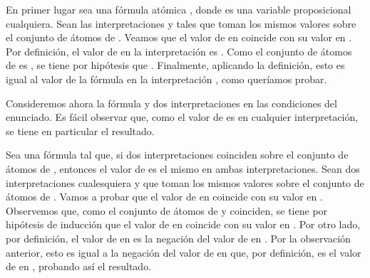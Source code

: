 \begin{isabellebody}
\begin{isamarkuptext}
\begin{demostracion}
    En primer lugar sea una fórmula atómica , donde  es una 
    variable proposicional cualquiera. Sean las interpretaciones
     y  tales que toman los mismos valores sobre el conjunto de
    átomos de . Veamos que el valor de  en  coincide con
    su valor en . Por definición, el valor de  en la
    interpretación  es . Como el conjunto de átomos de
     es , se tiene por hipótesis que .
    Finalmente, aplicando la definición, esto es igual al valor de la 
    fórmula  en la interpretación , como queríamos probar.

    Consideremos ahora la fórmula \isa{{\isasymbottom}} y dos interpretaciones en las 
    condiciones del enunciado. Es fácil observar que, como el valor de 
    \isa{{\isasymbottom}} es  en cualquier interpretación, se tiene en 
    particular el resultado.

    Sea una fórmula  tal que, si dos interpretaciones coinciden sobre
    el conjunto de átomos de , entonces el valor de  es el mismo
    en ambas interpretaciones. Sean dos interpretaciones cualesquiera
     y  que toman los mismos valores sobre el conjunto de
    átomos de . Vamos a probar que el valor de  en 
    coincide con su valor en .
    Observemos que, como el conjunto de átomos de  y 
    coinciden, se tiene por hipótesis de inducción que el valor de 
    en  coincide con su valor en . Por otro lado, por
    definición, el valor de  en  es la negación del valor
    de  en . Por la observación anterior, esto es igual a la
    negación del valor de  en  que, por definición, es el
    valor de  en , probando así el resultado.


\end{demostracion}
\end{isamarkuptext}
\end{isabellebody}
